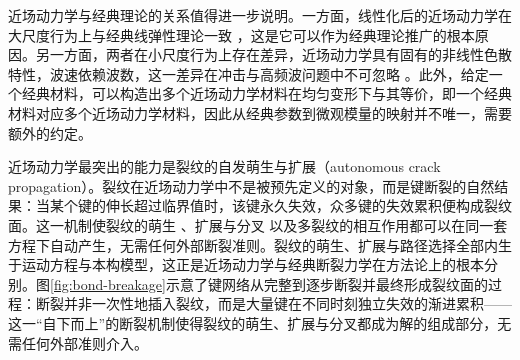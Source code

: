 近场动力学与经典理论的关系值得进一步说明。一方面，线性化后的近场动力学在大尺度行为上与经典线弹性理论一致 \cite{Silling2000,Silling2010}，这是它可以作为经典理论推广的根本原因。另一方面，两者在小尺度行为上存在差异，近场动力学具有固有的非线性色散特性，波速依赖波数，这一差异在冲击与高频波问题中不可忽略 \cite{SillingLehoucq2010}。此外，给定一个经典材料，可以构造出多个近场动力学材料在均匀变形下与其等价，即一个经典材料对应多个近场动力学材料，因此从经典参数到微观模量的映射并不唯一，需要额外的约定。

近场动力学最突出的能力是裂纹的自发萌生与扩展（autonomous crack propagation）。裂纹在近场动力学中不是被预先定义的对象，而是键断裂的自然结果：当某个键的伸长超过临界值时，该键永久失效，众多键的失效累积便构成裂纹面。这一机制使裂纹的萌生 \cite{SillingWeckner2010}、扩展与分叉 \cite{HaBobaru2010} 以及多裂纹的相互作用都可以在同一套方程下自动产生，无需任何外部断裂准则。裂纹的萌生、扩展与路径选择全部内生于运动方程与本构模型，这正是近场动力学与经典断裂力学在方法论上的根本分别。图\ref{fig:bond-breakage}示意了键网络从完整到逐步断裂并最终形成裂纹面的过程：断裂并非一次性地插入裂纹，而是大量键在不同时刻独立失效的渐进累积——这一“自下而上”的断裂机制使得裂纹的萌生、扩展与分叉都成为解的组成部分，无需任何外部准则介入。


